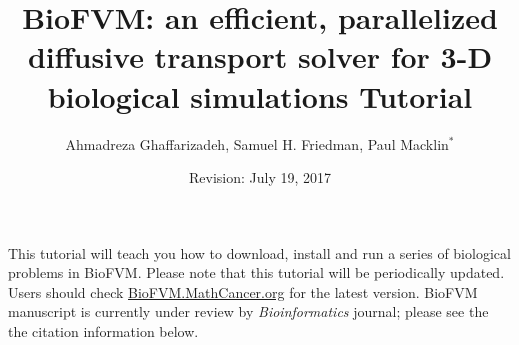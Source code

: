 \documentclass[11pt]{article}
\begin{document}
\author{Ahmadreza Ghaffarizadeh, Samuel H. Friedman, Paul Macklin${}^*$}
\title{BioFVM: an efficient, parallelized diffusive transport solver for 3-D biological simulations
\break\break
\textbf{\huge{Tutorial}}
}
\date{}
\date{Revision: July 19, 2017}	

\maketitle
This tutorial will teach you how to download, install and run a series of biological problems in BioFVM.
Please note that this tutorial will be periodically updated.
Users should check \href{http://BioFVM.MathCancer.org}{BioFVM.MathCancer.org}  for the latest version. BioFVM manuscript 
is currently under review by \textit{Bioinformatics} journal; please see the the citation information below.



\end{document}
